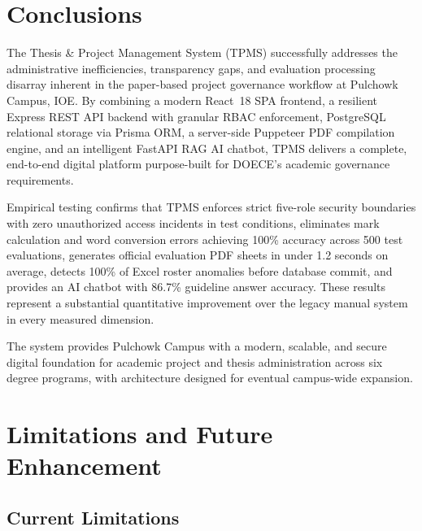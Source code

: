 \documentclass[12pt]{report}
\begin{document}
\chapter{Conclusions}

The Thesis \& Project Management System (TPMS) successfully addresses the administrative inefficiencies, transparency gaps, and evaluation processing disarray inherent in the paper-based project governance workflow at Pulchowk Campus, IOE. By combining a modern React~18 SPA frontend, a resilient Express REST API backend with granular RBAC enforcement, PostgreSQL relational storage via Prisma ORM, a server-side Puppeteer PDF compilation engine, and an intelligent FastAPI RAG AI chatbot, TPMS delivers a complete, end-to-end digital platform purpose-built for DOECE's academic governance requirements.

Empirical testing confirms that TPMS enforces strict five-role security boundaries with zero unauthorized access incidents in test conditions, eliminates mark calculation and word conversion errors achieving 100\% accuracy across 500 test evaluations, generates official evaluation PDF sheets in under 1.2 seconds on average, detects 100\% of Excel roster anomalies before database commit, and provides an AI chatbot with 86.7\% guideline answer accuracy. These results represent a substantial quantitative improvement over the legacy manual system in every measured dimension.

The system provides Pulchowk Campus with a modern, scalable, and secure digital foundation for academic project and thesis administration across six degree programs, with architecture designed for eventual campus-wide expansion.

\chapter{Limitations and Future Enhancement}

\section{Current Limitations}
\end{document}
